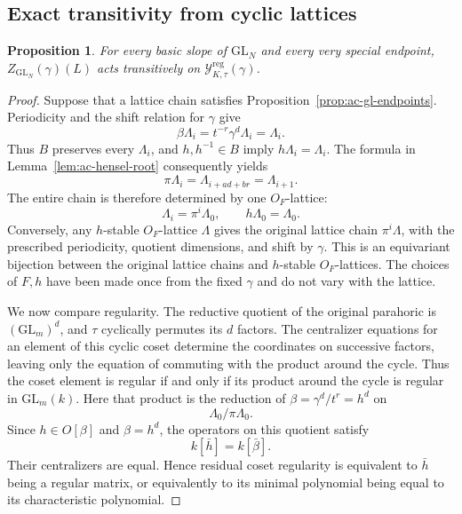 \documentclass[11pt,a4paper]{article}
\newtheorem{proposition}[theorem]{Proposition}
\theoremstyle{definition}
\theoremstyle{remark}
\begin{document}
\subsection{Exact transitivity from cyclic lattices}

\begin{proposition}\label{prop:ac-gl-transitivity}
For every basic slope of \(\mathrm{GL}_N\) and every very special
endpoint, \(Z_{\mathrm{GL}_N}(\gamma)(L)\) acts transitively on
\(\mathscr Y^{\mathrm{reg}}_{K,\tau}(\gamma)\).
\end{proposition}

\begin{proof}
Suppose that a lattice chain satisfies
Proposition~\ref{prop:ac-gl-endpoints}. Periodicity and the shift relation
for \(\gamma\) give
\[
\beta\Lambda_i=t^{-r}\gamma^d\Lambda_i=\Lambda_i.
\]
Thus \(B\) preserves every \(\Lambda_i\), and \(h,h^{-1}\in B\) imply
\(h\Lambda_i=\Lambda_i\). The formula in
Lemma~\ref{lem:ac-hensel-root} consequently yields
\[
\pi\Lambda_i=\Lambda_{i+ad+br}=\Lambda_{i+1}.
\]
The entire chain is therefore determined by one \(O_F\)-lattice:
\[
\Lambda_i=\pi^i\Lambda_0,\qquad h\Lambda_0=\Lambda_0.
\]
Conversely, any \(h\)-stable \(O_F\)-lattice \(\Lambda\) gives the original
lattice chain \(\pi^i\Lambda\), with the prescribed periodicity, quotient
dimensions, and shift by \(\gamma\). This is an equivariant bijection
between the original lattice chains and \(h\)-stable \(O_F\)-lattices.
The choices of \(F,h\) have been made once from the fixed \(\gamma\) and
do not vary with the lattice.

We now compare regularity. The reductive quotient of the original
parahoric is \((\mathrm{GL}_m)^d\), and \(\tau\) cyclically permutes its
\(d\) factors. The centralizer equations for an element of this cyclic
coset determine the coordinates on successive factors, leaving only the
equation of commuting with the product around the cycle. Thus the coset
element is regular if and only if its product around the cycle is
regular in \(\mathrm{GL}_m(k)\). Here that product is the reduction of
\(\beta=\gamma^d/t^r=h^d\) on
\[
\Lambda_0/\pi\Lambda_0.
\]
Since \(h\in O[\beta]\) and \(\beta=h^d\), the operators on this quotient
satisfy
\[
k[\bar h]=k[\bar\beta].
\]
Their centralizers are equal. Hence residual coset regularity is
equivalent to \(\bar h\) being a regular matrix, or equivalently to its
minimal polynomial being equal to its characteristic polynomial.


\end{proof}
\end{document}
